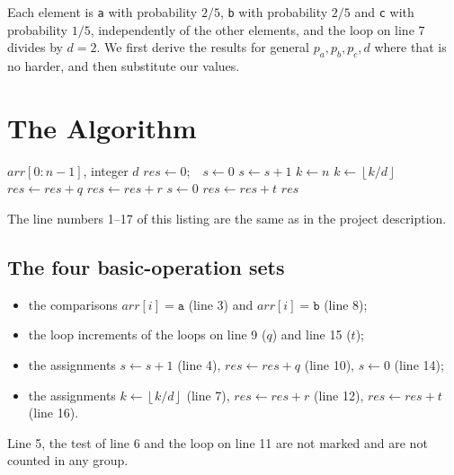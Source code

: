 \documentclass[11pt]{article}
\theoremstyle{remark}
\newcommand{\fl}[1]{\left\lfloor #1\right\rfloor}
\newcommand{\ta}{\texttt{a}}
\newcommand{\tb}{\texttt{b}}
\newcommand{\tc}{\texttt{c}}
\begin{document}


Each element is \ta{} with probability $2/5$, \tb{} with probability $2/5$ and \tc{} with probability $1/5$,
independently of the other elements, and the loop on line 7 divides by $d=2$. We first derive the results for general
$p_a,p_b,p_c,d$ where that is no harder, and then substitute our values.

\section{The Algorithm}
\begin{algorithm}[H]
\caption{Example Algorithm (as given in the project description)}
\begin{algorithmic}[1]
\Require $arr[0:n-1]$, integer $d$
\State $res \gets 0$;\ \ $s \gets 0$
  \If{$arr[i] = \ta$} 
    \State $s \gets s+1$ 
    \State $k \gets n$
      \State $k \gets \fl{k/d}$ 
    \EndWhile
  \ElsIf{$arr[i] = \tb$} 
     
      \State $res \gets res + q$ 
        \State $res \gets res + r$ 
      \EndFor
    \EndFor
  \Else \Comment{$arr[i]=\tc$}
    \State $s \gets 0$ 
     
      \State $res \gets res+t$ 
    \EndFor
  \EndIf
\EndFor
\State \Return $res$
\end{algorithmic}
\end{algorithm}
The line numbers 1--17 of this listing are the same as in the project description.

\subsection{The four basic-operation sets}
\begin{itemize}[nosep]
\item[(1)] the comparisons $arr[i]=\ta$ (line 3) and $arr[i]=\tb$ (line 8);
\item[(2)] the loop increments of the loops on line 9 ($q$) and line 15 ($t$);
\item[(3)] the assignments $s\gets s+1$ (line 4), $res\gets res+q$ (line 10), $s\gets 0$ (line 14);
\item[(4)] the assignments $k\gets\fl{k/d}$ (line 7), $res\gets res+r$ (line 12), $res\gets res+t$ (line 16).
\end{itemize}
Line 5, the test of line 6 and the loop on line 11 are not marked and are not counted in any group.
\end{document}
